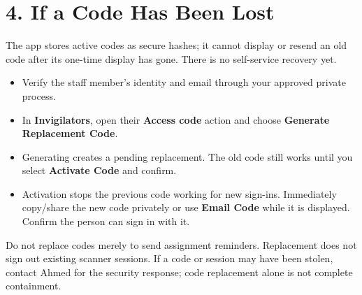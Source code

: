 \documentclass[10pt,a4paper]{article}
\begin{document}
\section*{4. If a Code Has Been Lost}
The app stores active codes as secure hashes; it cannot display or resend an old code after its one-time display has gone. There is no self-service recovery yet.\par
\begin{itemize}\item[1.] Verify the staff member's identity and email through your approved private process.\end{itemize}
\begin{itemize}\item[2.] In \textbf{Invigilators}, open their \textbf{Access code} action and choose \textbf{Generate Replacement Code}.\end{itemize}
\begin{itemize}\item[3.] Generating creates a pending replacement. The old code still works until you select \textbf{Activate Code} and confirm.\end{itemize}
\begin{itemize}\item[4.] Activation stops the previous code working for new sign-ins. Immediately copy/share the new code privately or use \textbf{Email Code} while it is displayed. Confirm the person can sign in with it.\end{itemize}
Do not replace codes merely to send assignment reminders. Replacement does not sign out existing scanner sessions. If a code or session may have been stolen, contact Ahmed for the security response; code replacement alone is not complete containment.\par
\end{document}
